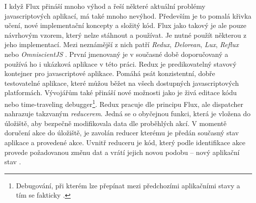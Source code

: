 I když Flux přináší mnoho výhod a řeší některé aktuální problémy javascriptových aplikací, má také mnoho nevýhod. Především je to pomalá křivka učení, nové implementační koncepty a složitý kód. Flux jako takový je ale pouze návrhovým vzorem, který nelze stáhnout a používat. Je nutné použít některou z jeho implementací. Mezi neznámější z nich patří \textit{Redux}, \textit{Delorean}, \textit{Lux}, \textit{Reflux} nebo \textit{OmniscientJS} \cite{flux_comparison}. První jmenovaný je v současné době doporučovaný a používá ho i ukázková aplikace v této práci. Redux je predikovatelný stavový kontejner pro javascriptové aplikace. Pomáhá psát konzistentní, dobře testovatelné aplikace, které můžou běžet na všech dostupných javascriptových platformách. Vývojářům také přináší nové možnosti jako je živá editace kódu nebo time-traveling debugger\footnote{Debugování, při kterém lze přepínat mezi předchozími aplikačními stavy a tím se fakticky .}. Redux pracuje dle principu Flux, ale dispatcher nahrazuje takzvaným \textit{reducerem}. Jedná se o obyčejnou funkci, která je vložena do úložiště, aby bezpečně modifikovala data dle proběhlých akcí. V momentě doručení akce do úložiště, je zavolán reducer kterému je předán současný stav aplikace a provedené akce. Uvnitř reduceru je kód, který podle identifikace akce provede požadovanou změnu dat a vrátí jejich novou podobu – nový aplikační stav \cite{flux} \cite{redux}.

